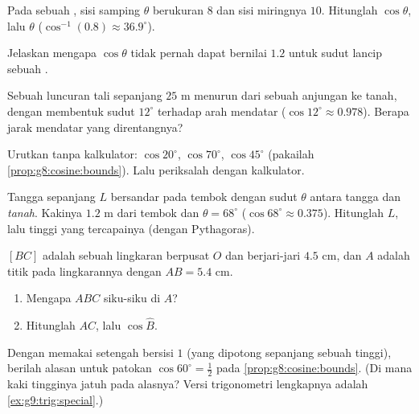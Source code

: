 \begin{exercise}[$\star$]\label{exo:g8:cosine:5}
Pada sebuah , sisi samping $\theta$ berukuran $8$
dan sisi miringnya $10$. Hitunglah $\cos\theta$, lalu $\theta$
($\cos^{-1}(0.8) \approx 36.9^\circ$).
\end{exercise}

\begin{exercise}[$\star$]\label{exo:g8:cosine:6}
Jelaskan mengapa $\cos\theta$ tidak pernah dapat bernilai $1.2$ untuk
sudut lancip sebuah .
\end{exercise}

\begin{exercise}[$\star\star$]\label{exo:g8:cosine:7}
Sebuah luncuran tali sepanjang $25$ m menurun dari sebuah anjungan ke
tanah, dengan membentuk sudut $12^\circ$ terhadap arah mendatar
($\cos 12^\circ \approx 0.978$). Berapa jarak mendatar yang direntangnya?
\end{exercise}

\begin{exercise}[$\star\star$]\label{exo:g8:cosine:8}
Urutkan tanpa kalkulator: $\cos 20^\circ$, $\cos 70^\circ$,
$\cos 45^\circ$ (pakailah \cref{prop:g8:cosine:bounds}). Lalu
periksalah dengan kalkulator.
\end{exercise}

\begin{exercise}[$\star\star$]\label{exo:g8:cosine:9}
Tangga sepanjang $L$ bersandar pada tembok dengan sudut $\theta$
antara tangga dan \emph{tanah}. Kakinya $1.2$ m dari tembok
dan $\theta = 68^\circ$ ($\cos 68^\circ \approx 0.375$). Hitunglah
$L$, lalu tinggi yang tercapainya (dengan Pythagoras).
\end{exercise}

\begin{exercise}[$\star\star$]\label{exo:g8:cosine:10}
$[BC]$ adalah  sebuah lingkaran berpusat $O$ dan berjari-jari
$4.5$ cm, dan $A$ adalah titik pada lingkarannya dengan $AB = 5.4$ cm.
\begin{enumerate}
  \item Mengapa $ABC$ siku-siku di $A$?
  \item Hitunglah $AC$, lalu $\cos \widehat B$.
\end{enumerate}
\end{exercise}

\begin{exercise}[$\star\star\star$]\label{exo:g8:cosine:11}
Dengan memakai setengah  bersisi $1$ (yang dipotong
sepanjang sebuah tinggi), berilah alasan untuk patokan
$\cos 60^\circ = \frac12$ pada \cref{prop:g8:cosine:bounds}. (Di mana
kaki tingginya jatuh pada alasnya? Versi trigonometri lengkapnya
adalah \cref{ex:g9:trig:special}.)
\end{exercise}

